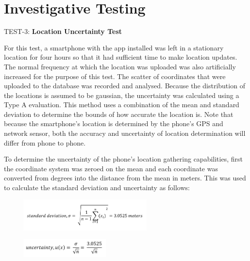 \section{Investigative Testing}
\label{sec:Investigative Testing}

TEST-3: \textbf{Location Uncertainty Test}

For this test, a smartphone with the app installed was left in a stationary location for four hours so that it had sufficient time to make location updates. The normal frequency at which the location was uploaded was also artificially increased for the purpose of this test. The scatter of coordinates that were uploaded to the database was recorded and analysed. Because the distribution of the locations is assumed to be gaussian, the uncertainty was calculated using a Type A evaluation. This method uses a combination of the mean and standard deviation to determine the bounds of how accurate the location is. Note that because the smartphone's location is determined by the phone's GPS and network sensor, both the accuracy and uncertainty of location determination will differ from phone to phone.

To determine the uncertainty of the phone's location gathering capabilities, first the coordinate system was zeroed on the mean and each coordinate was converted from degrees into the distance from the mean in meters. This was used to calculate the standard deviation and uncertainty as follows:

\begin{figure}[ht]
    \centering
    \includegraphics[width=0.6\textwidth]{figures/FormulaSTD.PNG}
    \label{fig:formula_std}
\end{figure}

\begin{figure}[ht]
    \centering
    \includegraphics[width=0.4\textwidth]{figures/FormulaUN.PNG}
    \label{fig:formula_std}
\end{figure}

